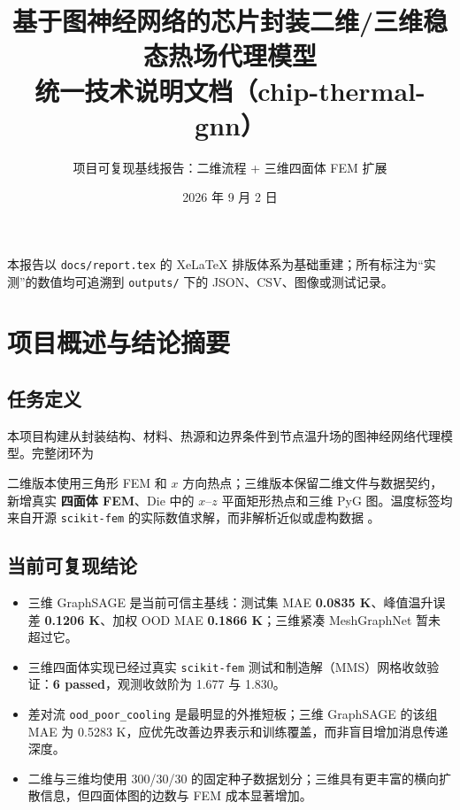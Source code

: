 \documentclass[11pt,a4paper]{article}
\title{\bfseries 基于图神经网络的芯片封装二维/三维稳态热场代理模型\\[0.4em]
\large 统一技术说明文档（chip-thermal-gnn）}
\author{项目可复现基线报告：二维流程 + 三维四面体 FEM 扩展}
\date{2026 年 9 月 2 日}
\newcommand{\code}[1]{\texttt{#1}}
\begin{document}
\maketitle
\begin{center}
\small 本报告以 \code{docs/report.tex} 的 XeLaTeX 排版体系为基础重建；所有标注为“实测”的数值均可追溯到 \code{outputs/} 下的 JSON、CSV、图像或测试记录。
\end{center}
\tableofcontents
\newpage

\section{项目概述与结论摘要}

\subsection{任务定义}
本项目构建从封装结构、材料、热源和边界条件到节点温升场的图神经网络代理模型。完整闭环为
\begin{center}
\end{center}

二维版本使用三角形 FEM 和 $x$ 方向热点；三维版本保留二维文件与数据契约，新增真实 \textbf{四面体 FEM}、Die 中的 $x$--$z$ 平面矩形热点和三维 PyG 图。温度标签均来自开源 \code{scikit-fem} 的实际数值求解，而非解析近似或虚构数据 \cite{skfem}。

\subsection{当前可复现结论}
\begin{itemize}[leftmargin=1.5em]
  \item 三维 GraphSAGE 是当前可信主基线：测试集 MAE \textbf{0.0835 K}、峰值温升误差 \textbf{0.1206 K}、加权 OOD MAE \textbf{0.1866 K}；三维紧凑 MeshGraphNet 暂未超过它。
  \item 三维四面体实现已经过真实 \code{scikit-fem} 测试和制造解（MMS）网格收敛验证：\textbf{6 passed}，观测收敛阶为 1.677 与 1.830。
  \item 差对流 \code{ood\_poor\_cooling} 是最明显的外推短板；三维 GraphSAGE 的该组 MAE 为 0.5283 K，应优先改善边界表示和训练覆盖，而非盲目增加消息传递深度。
  \item 二维与三维均使用 300/30/30 的固定种子数据划分；三维具有更丰富的横向扩散信息，但四面体图的边数与 FEM 成本显著增加。
\end{itemize}
\end{document}
